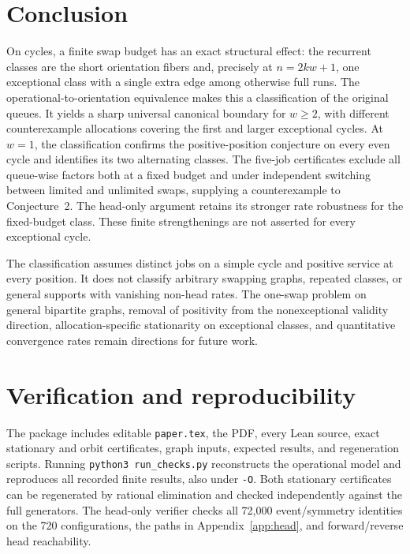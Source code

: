 \documentclass[11pt]{article}
\theoremstyle{remark}
\begin{document}
\section{Conclusion}\label{sec:conclusion}
On cycles, a finite swap budget has an exact structural effect: the recurrent classes are the short orientation fibers and, precisely at $n=2kw+1$, one exceptional class with a single extra edge among otherwise full runs. The operational-to-orientation equivalence makes this a classification of the original queues. It yields a sharp universal canonical boundary for $w\ge2$, with different counterexample allocations covering the first and larger exceptional cycles. At $w=1$, the classification confirms the positive-position conjecture on every even cycle and identifies its two alternating classes. The five-job certificates exclude all queue-wise factors both at a fixed budget and under independent switching between limited and unlimited swaps, supplying a counterexample to Conjecture~2. The head-only argument retains its stronger rate robustness for the fixed-budget class. These finite strengthenings are not asserted for every exceptional cycle.

The classification assumes distinct jobs on a simple cycle and positive service at every position. It does not classify arbitrary swapping graphs, repeated classes, or general supports with vanishing non-head rates. The one-swap problem on general bipartite graphs, removal of positivity from the nonexceptional validity direction, allocation-specific stationarity on exceptional classes, and quantitative convergence rates remain directions for future work.

\section{Verification and reproducibility}\label{sec:verification}
The package includes editable \texttt{paper.tex}, the PDF, every Lean source, exact stationary and orbit certificates, graph inputs, expected results, and regeneration scripts. Running \texttt{python3 run\_checks.py} reconstructs the operational model and reproduces all recorded finite results, also under \texttt{-O}. Both stationary certificates can be regenerated by rational elimination and checked independently against the full generators. The head-only verifier checks all 72,000 event/symmetry identities on the 720 configurations, the paths in Appendix~\ref{app:head}, and forward/reverse head reachability.
\end{document}
